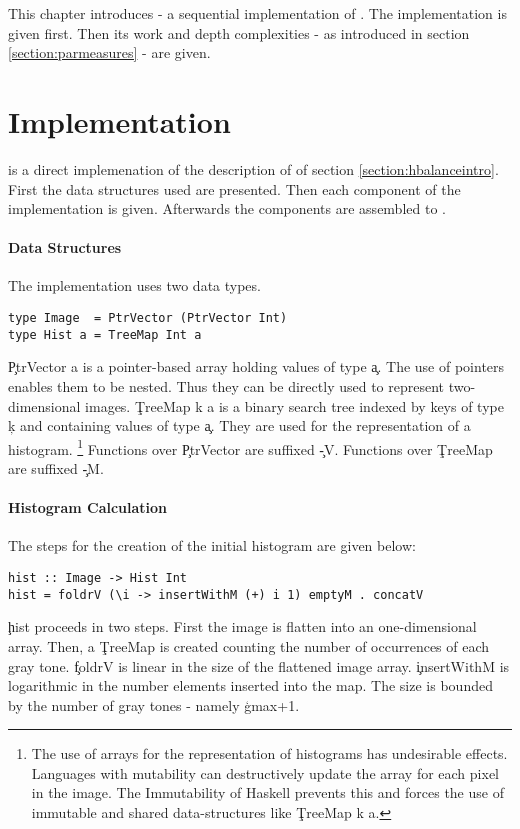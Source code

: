 

This chapter introduces \seq - a sequential implementation
of \algo. The implementation is given first. Then
its work and depth complexities - as introduced in section \ref{section:parmeasures}
- are given.


\section{Implementation}
  \seq is a direct implemenation of the description of \algo
  of section \ref{section:hbalanceintro}.
  First the data structures used are presented.
  Then each component of the implementation is given. Afterwards
  the components are assembled to \seq.
  
  \paragraph{Data Structures}
    The implementation uses two data types.
    \begin{lstlisting}
type Image  = PtrVector (PtrVector Int)
type Hist a = TreeMap Int a
    \end{lstlisting}
    \c{PtrVector a} is a pointer-based array holding values
    of type \c{a}. The use of pointers enables them to be nested.
    Thus they can be directly used to represent two-dimensional images.
    \c{TreeMap k a} is a binary search tree indexed by keys of type
    \c{k} and containing values of type \c{a}. They are
    used for the representation of a histogram.
    \footnote{The use of arrays for the representation of
    histograms has undesirable effects. Languages with
    mutability can destructively update the array
    for each pixel in the image. The Immutability
    of Haskell prevents this and forces the use of
    immutable and shared data-structures like \c{TreeMap k a}.}
    Functions over \c{PtrVector} are suffixed \c{-V}. Functions over \c{TreeMap} are suffixed \c{-M}.
  
  \paragraph{Histogram Calculation}
    The steps for the creation of the initial histogram are given below:
    \begin{lstlisting}
hist :: Image -> Hist Int
hist = foldrV (\i -> insertWithM (+) i 1) emptyM . concatV
    \end{lstlisting}
    \c{hist} proceeds in two steps. First the image is flatten
    into an one-dimensional array. Then, a \c{TreeMap} is created
    counting the number of occurrences of each gray tone.
    \c{foldrV} is linear in the size of the flattened image array.
    \c{insertWithM} is logarithmic in the number elements
    inserted into the map. The size is bounded by the number of 
    gray tones - namely \c{gmax+1}.
    
